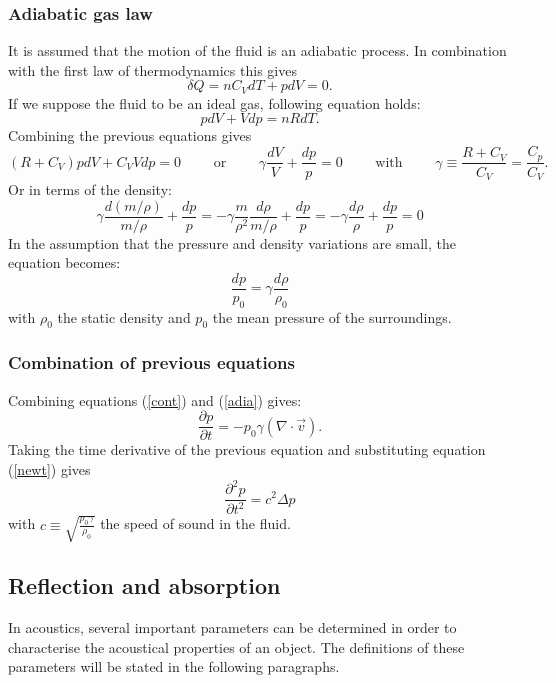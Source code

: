 \subsubsection*{Adiabatic gas law}
It is assumed that the motion of the fluid is an adiabatic process. In combination with the first law of thermodynamics this gives
\[
\delta Q = n C_V dT + p dV = 0.
\]
If we suppose the fluid to be an ideal gas, following equation holds:
\[
p dV + V dp = n R dT.
\]
Combining the previous equations gives
\[
(R+ C_V ) p dV + C_V V dp = 0  \qquad \textrm{ or } \qquad \gamma \frac{dV}{V} + \frac{dp}{p} = 0 \qquad \textrm{ with } \qquad \gamma \equiv \frac{R+C_V}{C_V} = \frac{C_p}{C_V}.
\]
Or in terms of the density:
\[
\gamma \frac{d(m/\rho)}{m/ \rho} + \frac{dp}{p} = -\gamma \frac{m}{\rho^2} \frac{d\rho}{m/ \rho} + \frac{dp}{p} =- \gamma \frac{d\rho}{\rho} + \frac{dp}{p} =0
\]
In the assumption that the pressure and density variations are small, the equation becomes:
\begin{equation}
\frac{dp}{p_0} =\gamma \frac{d\rho}{\rho_0}
\label{adia}
\end{equation}
with $\rho_0$ the static density and $p_0$ the mean pressure of the surroundings.





\subsubsection*{Combination of previous equations}
Combining equations (\ref{cont}) and (\ref{adia}) gives:
\begin{equation}
\frac{\partial p}{\partial t} = - p_0 \gamma \left(\nabla \cdot \vec{v}\right).
\label{dpdt}
\end{equation}
Taking the time derivative of the previous equation and substituting equation (\ref{newt}) gives
\[
\frac{\partial^2 p}{\partial t^2} =  c^2 \Delta p
\]
with $c\equiv \sqrt{\frac{p_0 \gamma}{\rho_0}}$ the speed of sound in the fluid.







\subsection{Reflection and absorption}
In acoustics, several important parameters can be determined in order to characterise the acoustical properties of an object. The  definitions of these parameters will be stated in the following paragraphs.



